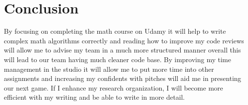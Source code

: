 \documentclass{scrartcl}
\begin{document}
\section{Conclusion}
By focusing on completing the math course on Udamy it will help to write complex math algorithms correctly and reading how to improve my code reviews will allow me to advise my team in a much more structured manner overall this will lead to our team having much cleaner code base. By improving my time management in the studio it will allow me to put more time into other assignments and increasing my confidents with pitches will aid me in presenting our next game. If I enhance my research organization, I will become more efficient with my writing and be able to write in more detail.




\end{document}
